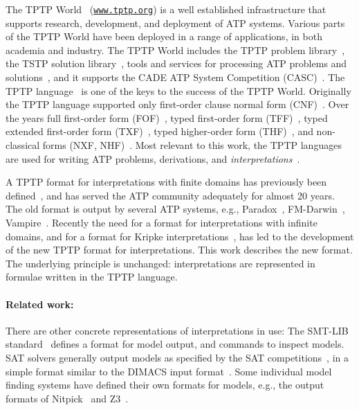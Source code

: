 \documentclass{easychair}
\begin{document}
The TPTP World~\cite{Sut17} (\href{https://www.tptp.org}{\tt www.tptp.org}) is a well established 
infrastructure that supports research, development, and deployment of 
ATP systems.
Various parts of the TPTP World have been deployed in a range of applications, in both academia 
and industry.
The TPTP World includes the TPTP problem library~\cite{Sut09}, 
the TSTP solution library~\cite{Sut10}, 
tools and services for processing ATP problems and solutions~\cite{Sut10}, 
and it supports the CADE ATP System Competition (CASC)~\cite{Sut16}.
The TPTP language~\cite{Sut23-IGPL} is one of the keys to the success of the TPTP World.
Originally the TPTP language supported only first-order clause normal form (CNF)~\cite{SS98-JAR}.
Over the years full first-order form (FOF)~\cite{Sut09}, 
typed first-order form (TFF)~\cite{SS+12,BP13-TFF1}, 
typed extended first-order form (TXF)~\cite{SK18}, 
typed higher-order form (THF)~\cite{SB10,KSR16}, 
and non-classical forms (NXF, NHF)~\cite{SF+22}.
Most relevant to this work, the TPTP languages are used for writing ATP problems, derivations, 
and \emph{interpretations}~\cite{SS+06,Sut08-KEAPPA}.

A TPTP format for interpretations with finite domains has previously been defined~\cite{SS+06},
and has served the ATP community adequately for almost 20 years. 
The old format is output by several ATP systems, e.g., Paradox~\cite{CS03}, FM-Darwin~\cite{BF+06}, 
Vampire~\cite{KV13}.
Recently the need for a format for interpretations with infinite domains, and for a format for 
Kripke interpretations~\cite{Kri63}, has led to the development of the new TPTP format for 
interpretations.
This work describes the new format.
The underlying principle is unchanged: interpretations are represented in formulae written in
the TPTP language.

\paragraph{Related work:}
There are other concrete representations of interpretations in use:
The SMT-LIB standard~\cite{BFT17} defines a format for model output, and commands to inspect 
models.  
SAT solvers generally output models as specified by the SAT competitions~\cite{JL+12}, in a 
simple format similar to the DIMACS input format~\cite{Bab93}.
Some individual model finding systems have defined their own formats for models, e.g., the 
output formats of Nitpick~\cite{BN10-ITP} and Z3~\cite{dMB08}.
\end{document}
